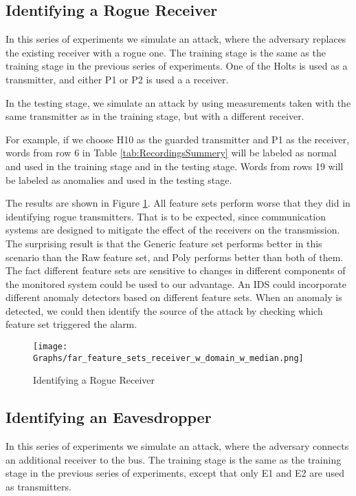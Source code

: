 \documentclass[conference]{IEEEtran}
\begin{document}
\subsection{Identifying a Rogue Receiver}
  In this series of experiments we simulate an attack, where the adversary replaces the existing receiver with a rogue one. The training stage is the same as the training stage in the previous series of experiments. One of the Holts is used as a transmitter, and either P1 or P2 is used a a receiver.
  
  In the testing stage, we simulate an attack by using measurements taken with the same transmitter as in the training stage, but with a different receiver.
  
  For example, if we choose H10 as the guarded transmitter and P1 as the receiver, words from row 6 in Table \ref{tab:RecordingsSummery} will be labeled as normal and used in the training stage and in the testing stage. Words from rows 19 will be labeled as anomalies and used in the testing stage.
  
  The results are shown in Figure \ref{fig:receiver_results}. All feature sets perform worse that they did in identifying rogue transmitters. That is to be expected, since communication systems are designed to mitigate the effect of the receivers on the transmission. The surprising result is that the Generic feature set performs better in this scenario than the Raw feature set, and Poly performs better than both of them. The fact different feature sets are sensitive to changes in different components of the monitored system could be used to our advantage. An IDS could incorporate different anomaly detectors based on different feature sets. When an anomaly is detected, we could then identify the source of the attack by checking which feature set triggered the alarm.
  
  \begin{figure}[t]
    \centering
    \texttt{[image: Graphs/far\_feature\_sets\_receiver\_w\_domain\_w\_median.png]}
    \caption{Identifying a Rogue Receiver}
    \label{fig:receiver_results}
  \end{figure}
  
\subsection{Identifying an Eavesdropper}
  In this series of experiments we simulate an attack, where the adversary connects an additional receiver to the bus. The training stage is the same as the training stage in the previous series of experiments, except that only E1 and E2 are used as transmitters.
  
\end{document}
